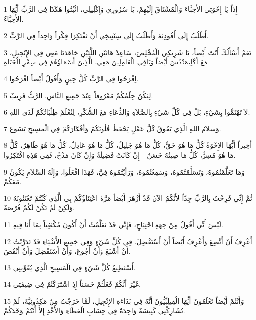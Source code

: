 \par 1 إِذاً يَا إِخْوَتِي الأَحِبَّاءَ وَالْمُشْتَاقَ إِلَيْهِمْ، يَا سُرُورِي وَإِكْلِيلِي، اثْبُتُوا هَكَذَا فِي الرَّبِّ أَيُّهَا الأَحِبَّاءُ.
\par 2 أَطْلُبُ إِلَى أَفُودِيَةَ وَأَطْلُبُ إِلَى سِنْتِيخِي أَنْ تَفْتَكِرَا فِكْراً وَاحِداً فِي الرَّبِّ.
\par 3 نَعَمْ أَسْأَلُكَ أَنْتَ أَيْضاً، يَا شَرِيكِي الْمُخْلِصَ، سَاعِدْ هَاتَيْنِ اللَّتَيْنِ جَاهَدَتَا مَعِي فِي الإِنْجِيلِ، مَعَ أَكْلِيمَنْدُسَ أَيْضاً وَبَاقِي الْعَامِلِينَ مَعِي، الَّذِينَ أَسْمَاؤُهُمْ فِي سِفْرِ الْحَيَاةِ.
\par 4 اِفْرَحُوا فِي الرَّبِّ كُلَّ حِينٍ وَأَقُولُ أَيْضاً افْرَحُوا.
\par 5 لِيَكُنْ حِلْمُكُمْ مَعْرُوفاً عِنْدَ جَمِيعِ النَّاسِ. الرَّبُّ قَرِيبٌ.
\par 6 لاَ تَهْتَمُّوا بِشَيْءٍ، بَلْ فِي كُلِّ شَيْءٍ بِالصَّلاَةِ وَالدُّعَاءِ مَعَ الشُّكْرِ، لِتُعْلَمْ طِلْبَاتُكُمْ لَدَى اللهِ.
\par 7 وَسَلاَمُ اللهِ الَّذِي يَفُوقُ كُلَّ عَقْلٍ يَحْفَظُ قُلُوبَكُمْ وَأَفْكَارَكُمْ فِي الْمَسِيحِ يَسُوعَ.
\par 8 أَخِيراً أَيُّهَا الإِخْوَةُ كُلُّ مَا هُوَ حَقٌّ، كُلُّ مَا هُوَ جَلِيلٌ، كُلُّ مَا هُوَ عَادِلٌ، كُلُّ مَا هُوَ طَاهِرٌ، كُلُّ مَا هُوَ مُسِرٌّ، كُلُّ مَا صِيتُهُ حَسَنٌ - إِنْ كَانَتْ فَضِيلَةٌ وَإِنْ كَانَ مَدْحٌ، فَفِي هَذِهِ افْتَكِرُوا.
\par 9 وَمَا تَعَلَّمْتُمُوهُ، وَتَسَلَّمْتُمُوهُ، وَسَمِعْتُمُوهُ، وَرَأَيْتُمُوهُ فِيَّ، فَهَذَا افْعَلُوا، وَإِلَهُ السَّلاَمِ يَكُونُ مَعَكُمْ.
\par 10 ثُمَّ إِنِّي فَرِحْتُ بِالرَّبِّ جِدّاً لأَنَّكُمُ الآنَ قَدْ أَزْهَرَ أَيْضاً مَرَّةً اعْتِنَاؤُكُمْ بِي الَّذِي كُنْتُمْ تَعْتَنُونَهُ وَلَكِنْ لَمْ تَكُنْ لَكُمْ فُرْصَةٌ.
\par 11 لَيْسَ أَنِّي أَقُولُ مِنْ جِهَةِ احْتِيَاجٍ، فَإِنِّي قَدْ تَعَلَّمْتُ أَنْ أَكُونَ مُكْتَفِياً بِمَا أَنَا فِيهِ.
\par 12 أَعْرِفُ أَنْ أَتَّضِعَ وَأَعْرِفُ أَيْضاً أَنْ أَسْتَفْضِلَ. فِي كُلِّ شَيْءٍ وَفِي جَمِيعِ الأَشْيَاءِ قَدْ تَدَرَّبْتُ أَنْ أَشْبَعَ وَأَنْ أَجُوعَ، وَأَنْ أَسْتَفْضِلَ وَأَنْ أَنْقُصَ.
\par 13 أَسْتَطِيعُ كُلَّ شَيْءٍ فِي الْمَسِيحِ الَّذِي يُقَوِّينِي.
\par 14 غَيْرَ أَنَّكُمْ فَعَلْتُمْ حَسَناً إِذِ اشْتَرَكْتُمْ فِي ضِيقَتِي.
\par 15 وَأَنْتُمْ أَيْضاً تَعْلَمُونَ أَيُّهَا الْفِيلِبِّيُّونَ أَنَّهُ فِي بَدَاءَةِ الإِنْجِيلِ، لَمَّا خَرَجْتُ مِنْ مَكِدُونِيَّةَ، لَمْ تُشَارِكْنِي كَنِيسَةٌ وَاحِدَةٌ فِي حِسَابِ الْعَطَاءِ وَالأَخْذِ إِلاَّ أَنْتُمْ وَحْدَكُمْ.
